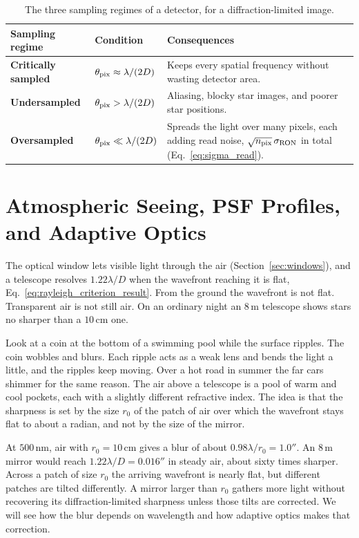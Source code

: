 \begin{table}[htbp]
	\centering
	\small
	\begin{tabular}{lp{4.6cm}p{6.6cm}}
		\toprule
		\textbf{Sampling regime} & \textbf{Condition} & \textbf{Consequences} \\
		\midrule
		\textbf{Critically sampled} & $\theta_{\rm pix} \approx \lambda/(2D)$ & Keeps every spatial frequency without wasting detector area. \\
		\textbf{Undersampled} & $\theta_{\rm pix} > \lambda/(2D)$ & Aliasing, blocky star images, and poorer star positions. \\
		\textbf{Oversampled} & $\theta_{\rm pix} \ll \lambda/(2D)$ & Spreads the light over many pixels, each adding read noise, $\sqrt{n_{\rm pix}}\,\sigma_{\rm RON}$ in total (Eq.~\eqref{eq:sigma_read}). \\
		\bottomrule
	\end{tabular}
	\caption{The three sampling regimes of a detector, for a diffraction-limited image.}
	\label{tab:sampling_regimes}
\end{table}

\section{Atmospheric Seeing, PSF Profiles, and Adaptive Optics}
\label{sec:seeing}

The optical window lets visible light through the air (Section~\ref{sec:windows}), and a telescope resolves $1.22\lambda/D$ when the wavefront reaching it is flat, Eq.~\eqref{eq:rayleigh_criterion_result}. From the ground the wavefront is not flat. Transparent air is not still air. On an ordinary night an $8\,\mathrm m$ telescope shows stars no sharper than a $10\,\mathrm{cm}$ one.

Look at a coin at the bottom of a swimming pool while the surface ripples. The coin wobbles and blurs. Each ripple acts as a weak lens and bends the light a little, and the ripples keep moving. Over a hot road in summer the far cars shimmer for the same reason. The air above a telescope is a pool of warm and cool pockets, each with a slightly different refractive index. The idea is that the sharpness is set by the size $r_0$ of the patch of air over which the wavefront stays flat to about a radian, and not by the size of the mirror.

At $500\,\mathrm{nm}$, air with $r_0=10\,\mathrm{cm}$ gives a blur of about $0.98\lambda/r_0=1.0''$. An $8\,\mathrm m$ mirror would reach $1.22\lambda/D=0.016''$ in steady air, about sixty times sharper. Across a patch of size $r_0$ the arriving wavefront is nearly flat, but different patches are tilted differently. A mirror larger than $r_0$ gathers more light without recovering its diffraction-limited sharpness unless those tilts are corrected. We will see how the blur depends on wavelength and how adaptive optics makes that correction.

